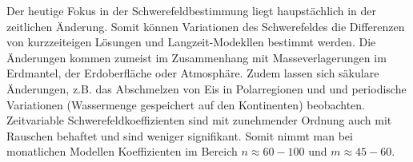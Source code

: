 \documentclass[9pt, landscape, fleqn]{scrartcl}
\begin{document}
\begin{multicols*}{3}
Der heutige Fokus in der Schwerefeldbestimmung liegt haupstächlich in der zeitlichen Änderung. Somit können Variationen des Schwerefeldes die Differenzen von kurzzeiteigen Lösungen und Langzeit-Modekllen bestimmt werden. Die Änderungen kommen zumeist im Zusammenhang mit Masseverlagerungen im Erdmantel, der Erdoberfläche oder Atmosphäre. Zudem lassen sich säkulare Änderungen, z.B. das Abschmelzen von Eis in Polarregionen und und periodische Variationen (Wassermenge gespeichert auf den Kontinenten) beobachten. \\

Zeitvariable Schwerefeldkoeffizienten sind mit zunehmender Ordnung auch mit Rauschen behaftet und sind weniger signifikant. Somit nimmt man bei monatlichen Modellen Koeffizienten im Bereich $n \approx 60-100$ und $m \approx 45-60$.
\end{multicols*}
\end{document}
